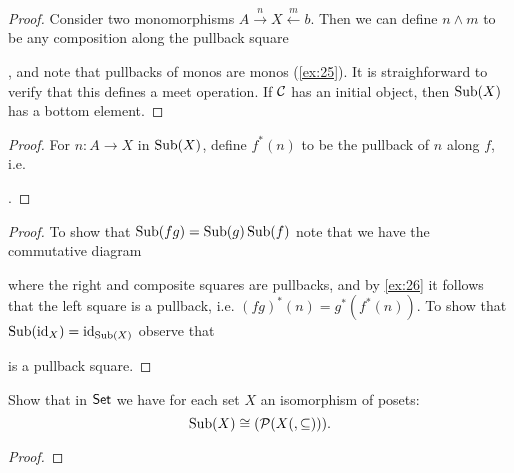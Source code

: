 \begin{solution}
    \begin{exercises}
        \item\begin{proof}
            Consider two monomorphisms $A\xrightarrow{n}X\xleftarrow{m}b$. 
            Then we can define $n\wedge m$ to be any composition along the pullback square
            , and note that pullbacks of monos are monos (\ref{ex:25}). It is straighforward to verify that this defines a meet operation. 
            If $\mathcal{C}$ has an initial object, then $\operatorname{Sub}(X)$ has a bottom element. 
        \end{proof}
        \item\begin{proof}
            For $n\colon A\to X$ in $\operatorname{Sub}(X)$, define $f^*(n)$ to be the pullback of $n$ along $f$, i.e.
            . 
        \end{proof}
        \item\begin{proof}
            To show that $\operatorname{Sub}(fg)=\operatorname{Sub}(g)\operatorname{Sub}(f)$ note that we have the commutative diagram
            \begin{center}
            \end{center}
            where the right and composite squares are pullbacks, and by \ref{ex:26} it follows that the left square is a pullback, i.e. $(fg)^*(n)=g^*(f^*(n))$.
            To show that $\operatorname{Sub}(\operatorname{id}_X)=\operatorname{id}_{\operatorname{Sub}(X)}$ observe that 
            is a pullback square. 
        \end{proof}
    \end{exercises}
\end{solution}

\begin{exercise}{9.3}
    Show that in $\normalfont\mathsf{Set}$ we have for each set $X$ an isomorphism of posets:
    \[ \operatorname{Sub}(X)\cong(\mathcal{P}(X(,\subseteq))). \]
\end{exercise}
\begin{solution}
    \begin{proof}
        
    \end{proof}
\end{solution}
